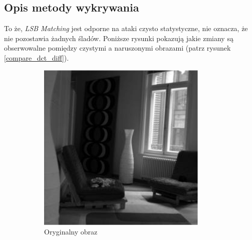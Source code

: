 \documentclass[a4paper,12pt]{article}
\begin{document}
    \subsection{Opis metody wykrywania}
        To że, \textit{LSB Matching} jest odporne na ataki czysto statystyczne, nie oznacza, że nie pozostawia żadnych śladów. Poniższe rysunki pokazują jakie zmiany są obserwowalne pomiędzy czystymi a naruszonymi obrazami (patrz rysunek \ref{compare_dct_diff}).

         \begin{figure}[h]
            \centering
            \begin{subfigure}{0.3\textwidth}
                \centering
                \includegraphics[width=\textwidth]{img/cover.png}
                \caption{Oryginalny obraz}
            \end{subfigure}
            \hfill
            \begin{subfigure}{0.3\textwidth}
                \centering

\end{subfigure}
\end{figure}
\end{document}
